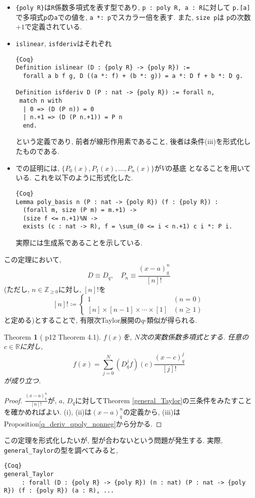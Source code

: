 \documentclass[11pt]{jarticle}
\theoremstyle{mystyle}
\newtheorem{thm}[df]{$\textrm{Theorem}$}
\newcommand{\bthm}{\begin{shadebox} \begin{thm}}
\newcommand{\ethm}{\end{thm} \end{shadebox}}
\newcommand{\bpf}{\begin{proof}}
\newcommand{\epf}{\end{proof}}
\newcommand{\Z}{\mathbb{Z}}
\newcommand{\R}{\mathbb{R}}
\newcommand{\0}{\textbf{0}}
\newcommand{\1}{\textbf{1}}
\newcommand{\2}{\textbf{2}}
\begin{document}
\begin{itemize}
  \item {\tt \{poly R\}}は{\tt R}係数多項式を表す型であり, {\tt p : {poly R}, a : R}に対して
  {\tt p.[a]}で多項式{\tt p}の{\tt a}での値を, {\tt a *: p}でスカラー倍を表す. また, {\tt size p}は
  {\tt p}の次数$+ 1$で定義されている. 
  \item {\tt islinear}, {\tt isfderiv}はそれぞれ
    \begin{lstlisting}{Coq}
Definition islinear (D : {poly R} -> {poly R}) :=
  forall a b f g, D ((a *: f) + (b *: g)) = a *: D f + b *: D g.

Definition isfderiv D (P : nat -> {poly R}) := forall n,
 match n with
  | 0 => (D (P n)) = 0
  | n.+1 => (D (P n.+1)) = P n
  end. \end{lstlisting}
    という定義であり, 前者が線形作用素であること, 後者は条件(iii)を形式化したものである. 
  \item \cite{Kac}での証明には, $\{P_0(x), P_1(x), \ldots , P_n(x)\}$が$V$の基底
    となることを用いている. これを以下のように形式化した. 
    \begin{lstlisting}{Coq}
Lemma poly_basis n (P : nat -> {poly R}) (f : {poly R}) :
  (forall m, size (P m) = m.+1) ->
  (size f <= n.+1)%N ->
  exists (c : nat -> R), f = \sum_(0 <= i < n.+1) c i *: P i. \end{lstlisting}
    実際には生成系であることを示している. 
\end{itemize}
この定理において, 
\[
  D \equiv D_q, \quad P_n \equiv \frac{(x-a)^n_q}{[n]!}
\]
(ただし, $n\in\Z_{\ge0}$に対し, $[n]!$を
\[
    [n]! \coloneqq \begin{cases}
                          1 & (n=0)\\
                          [n]\times[n-1]\times\cdots\times[1] & (n\ge1)
                        \end{cases}
\]
と定める)とすることで, 有限次Taylor展開の$q$-類似が得られる. 
\bthm[\cite{Kac} p12 Theorem 4.1] \label{q_Taylor}
$f(x)$を, $N$次の実数係数多項式とする. 任意の$c\in\R$に対し, 
  \[
    f(x) = \sum_{j=0}^N (D_q^jf)(c)\frac{(x-c)^j_q}{[j]!}
  \]
が成り立つ. 
\ethm
\bpf
$\frac{(x-a)^n_q}{[n]!}$が, $a$, $D_q$に対してTheorem \ref{general_Taylor}の三条件をみたすことを確かめればよい. (i), (ii)は$(x-a)^n_q$の定義から, (iii)はProposition\ref{q_deriv_qpoly_nonneg}から分かる. 
\epf
この定理を形式化したいが, 型が合わないという問題が発生する. 実際, {\tt general\_Taylor}の型を調べてみると, 
\begin{lstlisting}{Coq}
general_Taylor
     : forall (D : {poly R} -> {poly R}) (n : nat) (P : nat -> {poly R}) (f : {poly R}) (a : R), ...\end{lstlisting}
\end{document}
